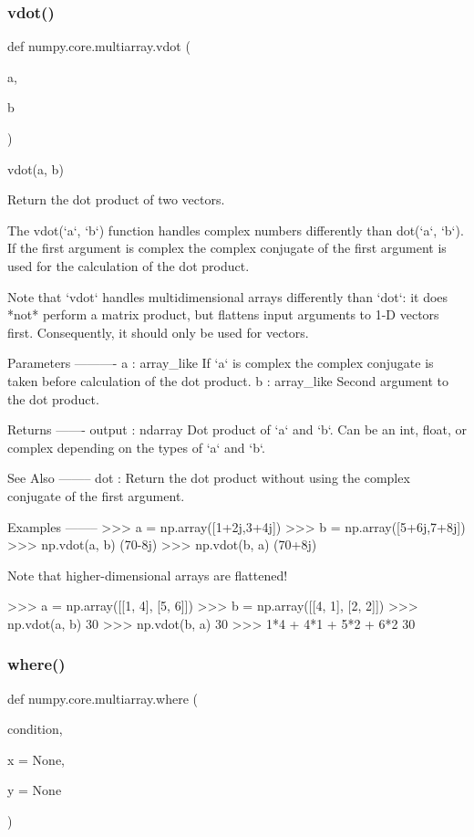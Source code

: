 \subsubsection{\texorpdfstring{vdot()}{vdot()}}
{\footnotesize\ttfamily def numpy.\+core.\+multiarray.\+vdot (\begin{DoxyParamCaption}\item[{}]{a,  }\item[{}]{b }\end{DoxyParamCaption})}

\begin{DoxyVerb}vdot(a, b)

Return the dot product of two vectors.

The vdot(`a`, `b`) function handles complex numbers differently than
dot(`a`, `b`).  If the first argument is complex the complex conjugate
of the first argument is used for the calculation of the dot product.

Note that `vdot` handles multidimensional arrays differently than `dot`:
it does *not* perform a matrix product, but flattens input arguments
to 1-D vectors first. Consequently, it should only be used for vectors.

Parameters
----------
a : array_like
    If `a` is complex the complex conjugate is taken before calculation
    of the dot product.
b : array_like
    Second argument to the dot product.

Returns
-------
output : ndarray
    Dot product of `a` and `b`.  Can be an int, float, or
    complex depending on the types of `a` and `b`.

See Also
--------
dot : Return the dot product without using the complex conjugate of the
      first argument.

Examples
--------
>>> a = np.array([1+2j,3+4j])
>>> b = np.array([5+6j,7+8j])
>>> np.vdot(a, b)
(70-8j)
>>> np.vdot(b, a)
(70+8j)

Note that higher-dimensional arrays are flattened!

>>> a = np.array([[1, 4], [5, 6]])
>>> b = np.array([[4, 1], [2, 2]])
>>> np.vdot(a, b)
30
>>> np.vdot(b, a)
30
>>> 1*4 + 4*1 + 5*2 + 6*2
30\end{DoxyVerb}
 \mbox{\label{namespacenumpy_1_1core_1_1multiarray_a8ce110e08e21273e014fdd160d5a14f3}} 
\subsubsection{\texorpdfstring{where()}{where()}}
{\footnotesize\ttfamily def numpy.\+core.\+multiarray.\+where (\begin{DoxyParamCaption}\item[{}]{condition,  }\item[{}]{x = {\ttfamily None},  }\item[{}]{y = {\ttfamily None} }\end{DoxyParamCaption})}

